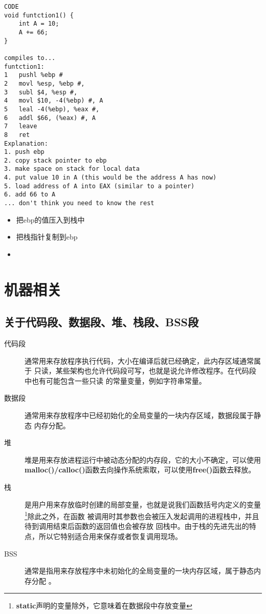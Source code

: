 \documentclass{article}
\begin{document}
\begin{verbatim}
CODE
void funtction1() {
	int A = 10;
	A += 66;
}

compiles to...
funtction1:
1	pushl %ebp #
2	movl %esp, %ebp #,
3	subl $4, %esp #,
4	movl $10, -4(%ebp) #, A
5	leal -4(%ebp), %eax #, 
6	addl $66, (%eax) #, A
7	leave
8	ret
Explanation:
1. push ebp
2. copy stack pointer to ebp
3. make space on stack for local data
4. put value 10 in A (this would be the address A has now)
5. load address of A into EAX (similar to a pointer)
6. add 66 to A
... don't think you need to know the rest
\end{verbatim}

\begin{itemize}
\item[(1)] 把ebp的值压入到栈中
\item[(2)] 把栈指针复制到ebp
\item[(3)] [tbd]
\end{itemize}

\section{机器相关}

\subsection{关于代码段、数据段、堆、栈段、BSS段}
\begin{description}
\item[代码段] 通常用来存放程序执行代码，大小在编译后就已经确定，此内存区域通常属于
只读，某些架构也允许代码段可写，也就是说允许修改程序。在代码段中也有可能包含一些只读
的常量变量，例如字符串常量。
\item[数据段] 通常用来存放程序中已经初始化的全局变量的一块内存区域，数据段属于静态
内存分配。
\item[堆] 堆是用来存放进程运行中被动态分配的内存段，它的大小不确定，可以使用\textbf{
malloc()/calloc()}函数去向操作系统索取，可以使用\textbf{free()}函数去释放。
\item[栈] 是用户用来存放临时创建的局部变量，也就是说我们函数括号内定义的变量
\footnote{\textbf{static}声明的变量除外，它意味着在数据段中存放变量}除此之外，在函数
被调用时其参数也会被压入发起调用的进程栈中，并且待到调用结束后函数的返回值也会被存放
回栈中。由于栈的先进先出的特点，所以它特别适合用来保存或者恢复调用现场。
\item[BSS] 通常是指用来存放程序中未初始化的全局变量的一块内存区域，属于静态内存分配
。
\end{description}
\end{document}
